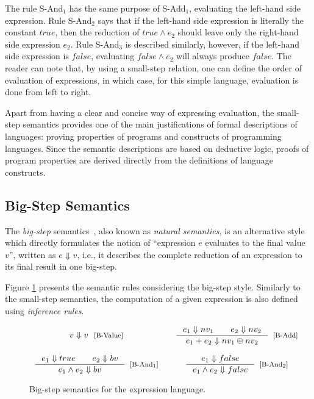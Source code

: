\documentclass[tese,capa,english]{texufpel}
\begin{document}
The rule {\footnotesize S-And$_1$} has the same purpose of {\footnotesize S-Add$_1$}, evaluating the left-hand side expression. Rule {\footnotesize S-And$_2$} says that if the left-hand side expression is literally the constant $true$, then the reduction of $true \wedge e_2$ should leave only the right-hand side expression $e_2$. Rule {\footnotesize S-And$_3$} is described similarly, however, if the left-hand side expression is $false$, evaluating $false \wedge e_2$ will always produce $false$. The reader can note that, by using a small-step relation, one can define the order of evaluation of expressions, in which case, for this simple language, evaluation is done from left to right.


Apart from having a clear and concise way of expressing evaluation, the small-step semantics provides one of the main justifications of formal descriptions of languages: proving properties of programs and constructs of programming languages. Since the semantic descriptions are based on deductive logic, proofs of program properties are derived directly from the definitions of language constructs.

\subsection{Big-Step Semantics}

The \emph{big-step} semantics~\cite{Kahn:1987:NS:28220.28222}, also known as \emph{natural semantics}, is an alternative style which directly formulates the notion of ``expression $e$ evaluates to the final value $v$'', written as $e \Downarrow v$, i.e., it describes the complete reduction of an expression to its final result in one big-step.

Figure \ref{fig:bigexp} presents the semantic rules considering the big-step style. Similarly to the small-step semantics, the computation of a given expression is also defined using \emph{inference rules}. 

\begin{figure}[!htb]
\[
\begin{array}{ccc}    
v \Downarrow v \ \ \textrm{\footnotesize[B-Value]}
& &
  \inference{e_1 \Downarrow nv_1 \ \ \ \ \ \ e_2 \Downarrow nv_2}
            {e_1 + e_2 \Downarrow nv_1 \oplus nv_2}[\textrm{[B-Add]}]      
\\ \\
  \inference{e_1 \Downarrow true \ \ \ \ \ \ e_2 \Downarrow bv}
            {e_1 \wedge e_2 \Downarrow bv}[\textrm{[B-And$_1$]}]
& &    
  \inference{e_1 \Downarrow false}
            {e_1 \wedge e_2 \Downarrow false}[\textrm{[B-And$_2$]}]
\end{array}    
\] 
\caption{Big-step semantics for the expression language.}
\label{fig:bigexp}
\end{figure}
\end{document}
